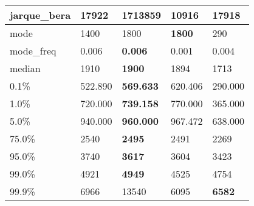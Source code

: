 \begin{table}[H]
\begin{tabular}{|l|m{10em}|m{10em}|m{10em}|m{10em}|}
\hline jarque\_bera & 17922 & \cellcolor[rgb]{0.9, 0.54, 0.52} 1713859 & 10916 & \bfseries 17918 \\
\hline mode & 1400 & 1800 & \bfseries 1800 & \cellcolor[rgb]{0.9, 0.54, 0.52} 290 \\
\hline mode\_freq & 0.006 & \bfseries 0.006 & \cellcolor[rgb]{0.9, 0.54, 0.52} 0.001 & 0.004 \\
\hline median & 1910 & \bfseries 1900 & 1894 & \cellcolor[rgb]{0.9, 0.54, 0.52} 1713 \\
\hline 0.1\% & 522.890 & \bfseries 569.633 & 620.406 & \cellcolor[rgb]{0.9, 0.54, 0.52} 290.000 \\
\hline 1.0\% & 720.000 & \bfseries 739.158 & 770.000 & \cellcolor[rgb]{0.9, 0.54, 0.52} 365.000 \\
\hline 5.0\% & 940.000 & \bfseries 960.000 & 967.472 & \cellcolor[rgb]{0.9, 0.54, 0.52} 638.000 \\
\hline 75.0\% & 2540 & \bfseries 2495 & 2491 & \cellcolor[rgb]{0.9, 0.54, 0.52} 2269 \\
\hline 95.0\% & 3740 & \bfseries 3617 & 3604 & \cellcolor[rgb]{0.9, 0.54, 0.52} 3423 \\
\hline 99.0\% & 4921 & \bfseries 4949 & \cellcolor[rgb]{0.9, 0.54, 0.52} 4525 & 4754 \\
\hline 99.9\% & 6966 & \cellcolor[rgb]{0.9, 0.54, 0.52} 13540 & 6095 & \bfseries 6582 \\
\hline
\end{tabular}
\end{table}

